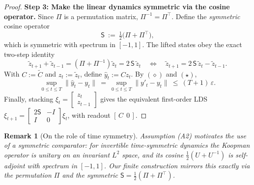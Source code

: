 \documentclass[11pt]{article}
\newtheorem{remark}[theorem]{Remark}
\numberwithin{equation}{section}
\begin{document}
{\begin{proof}
\textbf{Step 3: Make the linear dynamics symmetric via the cosine operator.}
Since $\Pi$ is a permutation matrix, $\Pi^{-1}=\Pi^\top$.
Define the \emph{symmetric} cosine operator
\[
\mathsf{S}\ :=\ \tfrac12\big(\Pi+\Pi^\top\big),
\]
which is symmetric with spectrum in $[-1,1]$.
The lifted states obey the exact two-step identity
\[
\tilde z_{t+1}+ \tilde z_{t-1}=(\Pi+\Pi^{-1})\tilde z_t=2\,\mathsf{S}\,\tilde z_t
\quad\Longleftrightarrow\quad
\tilde z_{t+1}=2\,\mathsf{S}\,\tilde z_t-\tilde z_{t-1}.
\]
With $C:=\tilde C$ and $z_t:=\tilde z_t$, define $\hat y_t:=C z_t$.
By $(\diamond)$ and $(\star)$,
\[
\sup_{0\le t\le T}\|\hat y_t-y_t\|\ =\ \sup_{0\le t\le T}\|y'_t-y_t\|\ \le\ (T+1)\,\varepsilon.
\]
Finally, stacking $\xi_t=\begin{bmatrix}z_t\\ z_{t-1}\end{bmatrix}$ gives the equivalent first-order LDS
$\xi_{t+1}=\begin{bmatrix}2\mathsf{S}&-I\\ I&0\end{bmatrix}\xi_t$, with readout $[\,C\ \ 0\,]$.
\end{proof}

\begin{remark}[On the role of time symmetry]
Assumption (A2) motivates the use of a symmetric comparator: for invertible time-symmetric dynamics the Koopman
operator is unitary on an invariant $L^2$ space, and its cosine $\tfrac12(U+U^{-1})$ is self-adjoint with spectrum in $[-1,1]$.
Our finite construction mirrors this exactly via the permutation $\Pi$ and the symmetric $\mathsf{S}=\tfrac12(\Pi+\Pi^\top)$.
\end{remark}

}






\end{document}
